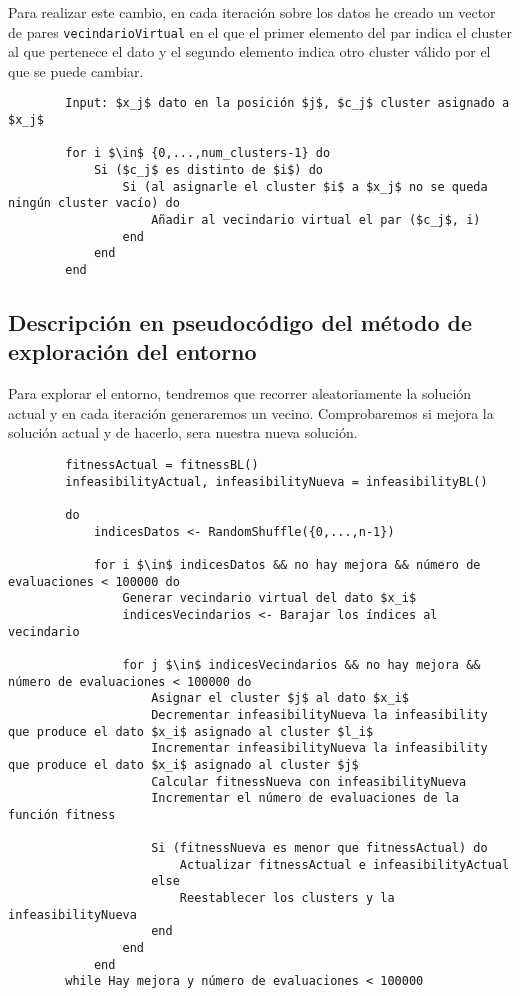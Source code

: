 		Para realizar este cambio, en cada iteración sobre los datos he creado un vector de pares \lstinline!vecindarioVirtual! en el que el primer 
		elemento del par indica el cluster al que pertenece el dato y el segundo elemento indica otro cluster válido por el que se puede cambiar.

		\begin{lstlisting}
		Input: $x_j$ dato en la posición $j$, $c_j$ cluster asignado a $x_j$

		for i $\in$ {0,...,num_clusters-1} do 
			Si ($c_j$ es distinto de $i$) do
				Si (al asignarle el cluster $i$ a $x_j$ no se queda ningún cluster vacío) do 
					Añadir al vecindario virtual el par ($c_j$, i)
				end
			end 
		end
		\end{lstlisting}

	\subsection{Descripción en pseudocódigo del método de exploración del entorno}
		Para explorar el entorno, tendremos que recorrer aleatoriamente la solución actual y 
		en cada iteración generaremos un vecino. Comprobaremos si mejora la solución actual y 
		de hacerlo, sera nuestra nueva solución.
		\begin{lstlisting}
		fitnessActual = fitnessBL()
		infeasibilityActual, infeasibilityNueva = infeasibilityBL()

		do
			indicesDatos <- RandomShuffle({0,...,n-1})

			for i $\in$ indicesDatos && no hay mejora && número de evaluaciones < 100000 do
				Generar vecindario virtual del dato $x_i$
				indicesVecindarios <- Barajar los índices al vecindario

				for j $\in$ indicesVecindarios && no hay mejora && número de evaluaciones < 100000 do 
					Asignar el cluster $j$ al dato $x_i$
					Decrementar infeasibilityNueva la infeasibility que produce el dato $x_i$ asignado al cluster $l_i$
					Incrementar infeasibilityNueva la infeasibility que produce el dato $x_i$ asignado al cluster $j$
					Calcular fitnessNueva con infeasibilityNueva
					Incrementar el número de evaluaciones de la función fitness 

					Si (fitnessNueva es menor que fitnessActual) do 
						Actualizar fitnessActual e infeasibilityActual
					else 
						Reestablecer los clusters y la infeasibilityNueva
					end
				end
			end
		while Hay mejora y número de evaluaciones < 100000
		\end{lstlisting}
\newpage


